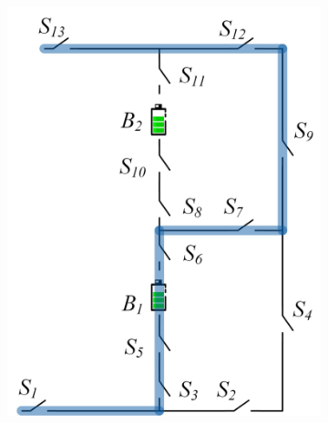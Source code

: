 \documentclass{article}
\begin{document}
\begin{figure}[htbp]
    \centering
    \begin{subfigure}[b]{0.27\textwidth}
        \includegraphics[width=\textwidth]{e2f1-mac.png}
        \caption{}
        \label{fig:e2f1-mac}
    \end{subfigure}
    \hspace{0.02\textwidth}
    \begin{subfigure}[b]{0.31\textwidth}

\end{subfigure}
\end{figure}
\end{document}
